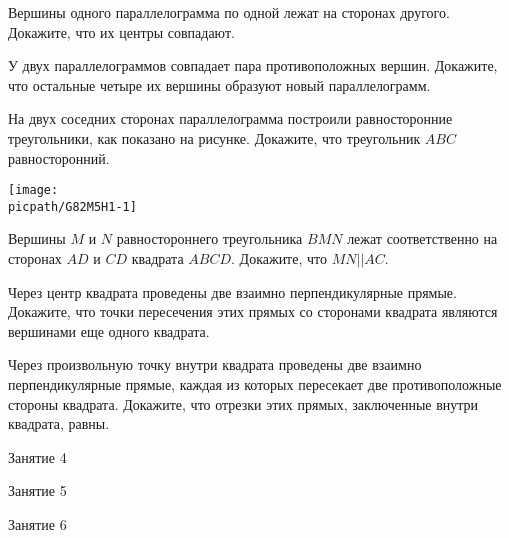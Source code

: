 \begin{class}[number=3]
	\begin{listofex}
		\item Вершины одного параллелограмма по одной лежат на сторонах другого. Докажите, что их центры совпадают.
		\item У двух параллелограммов совпадает пара противоположных вершин. Докажите, что остальные четыре их вершины образуют новый параллелограмм.
		\item На двух соседних сторонах параллелограмма построили равносторонние треугольники, как показано на рисунке. Докажите, что треугольник \( ABC \) равносторонний.
		\begin{center}
			\texttt{[image: \\picpath/G82M5H1-1]}
		\end{center}
		\item Вершины \( M \) и \( N \) равностороннего треугольника \( BMN \)
		лежат соответственно на сторонах \( AD \) и \( CD \) квадрата \( ABCD \).
		Докажите, что \( MN || AC \).
		\item Через центр квадрата проведены две взаимно
		перпендикулярные прямые. Докажите, что точки пересечения этих
		прямых со сторонами квадрата являются вершинами еще одного
		квадрата.
		\item Через произвольную точку внутри квадрата
		проведены две взаимно перпендикулярные прямые,
		каждая из которых пересекает две противоположные
		стороны квадрата. Докажите, что отрезки этих прямых,
		заключенные внутри квадрата, равны.
	\end{listofex}
\end{class}

\begin{class}[number=4]
	\begin{listofex}
		\item Занятие 4
	\end{listofex}
\end{class}

\begin{class}[number=5]
	\begin{listofex}
		\item Занятие 5
	\end{listofex}
\end{class}

\begin{class}[number=6]
	\begin{listofex}
		\item Занятие 6
	\end{listofex}
\end{class}

